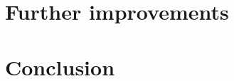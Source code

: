 \section{Further improvements}
\label{sec:other-solutions}




\pagebreak      %
\section{Conclusion}
\label{sec:conclusion}



\pagebreak      %


\pagebreak
\appendix



